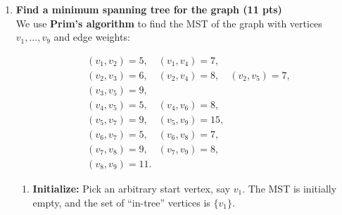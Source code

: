 \documentclass[a4paper,12pt]{article}
\begin{document}
\begin{enumerate}
\begin{enumerate}
        \item \textbf{Settle \(v_7\)} (distance = 20):
        Neighbors: \((v_7, v_8) = 9\).
        \[
        \text{dist}(v_8) ? 20 + 9 = 29 \quad (\text{already }22)\rightarrow \text{no change}.
        \]
        
        \item \textbf{Settle \(v_8\)} (distance = 22):
        Neighbor: \((v_8, v_9) = 11\).
        \[
        \text{dist}(v_9) ? 22 + 11 = 33 \quad (\text{already } 27)\rightarrow \text{no change}.
        \]
        
        \item \textbf{Settle \(v_9\)} (distance = 27):
        No more updates since all others visited.
    \end{enumerate}

    Thus, \(\text{dist}(v_9) = 27\). Tracing predecessors back shows the path
    \[
    v_1 \;\to\; v_4 \;\to\; v_5 \;\to\; v_9 \;
    \]
    with total cost \(7 + 5 + 15 = 27.\)

    Alternatively, another path is.
    \[
    v_1 \;\to\; v_2 \;\to\; v_5 \;\to\; v_9 \;
    \]

    with total cost \(5 + 7 + 15 = 27.\)


    \item \textbf{Find a minimum spanning tree for the graph (11 pts)}\\[6pt]

    We use \textbf{Prim's algorithm} to find the MST of the graph with vertices \(v_1,\dots,v_9\) and edge weights:

    \[
    \begin{aligned}
    &(v_1, v_2) = 5,\quad (v_1, v_4) = 7,\\
    &(v_2, v_3) = 6,\quad (v_2, v_4) = 8,\quad (v_2, v_5) = 7,\\
    &(v_3, v_5) = 9,\\
    &(v_4, v_5) = 5,\quad (v_4, v_6) = 8,\\
    &(v_5, v_7) = 9,\quad (v_5, v_9) = 15,\\
    &(v_6, v_7) = 5,\quad (v_6, v_8) = 7,\\
    &(v_7, v_8) = 9,\quad (v_7, v_9) = 8,\\
    &(v_8, v_9) = 11.
    \end{aligned}
    \]

    \begin{enumerate}
    \item \textbf{Initialize:} Pick an arbitrary start vertex, say \(v_1\). The MST is initially empty, and the set of “in-tree” vertices is \(\{v_1\}\).


\end{enumerate}
\end{enumerate}
\end{document}
